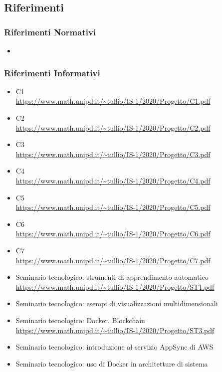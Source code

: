 \subsection{Riferimenti}
\subsubsection{Riferimenti Normativi}
\begin{itemize}
	\item {} %
\end{itemize}

\subsubsection{Riferimenti Informativi}
\begin{itemize}
	\item{C1\\
		\url{https://www.math.unipd.it/~tullio/IS-1/2020/Progetto/C1.pdf}}
	\item{C2\\
		\url{https://www.math.unipd.it/~tullio/IS-1/2020/Progetto/C2.pdf}}
	\item{C3\\
		\url{https://www.math.unipd.it/~tullio/IS-1/2020/Progetto/C3.pdf}}
	\item{C4\\
		\url{https://www.math.unipd.it/~tullio/IS-1/2020/Progetto/C4.pdf}}
	\item{C5\\
		\url{https://www.math.unipd.it/~tullio/IS-1/2020/Progetto/C5.pdf}}
	\item{C6\\
		\url{https://www.math.unipd.it/~tullio/IS-1/2020/Progetto/C6.pdf}}
	\item{C7\\
		\url{https://www.math.unipd.it/~tullio/IS-1/2020/Progetto/C7.pdf}}
	
	\item {Seminario tecnologico: strumenti di apprendimento automatico\\
		\url{https://www.math.unipd.it/~tullio/IS-1/2020/Progetto/ST1.pdf}}
	\item {Seminario tecnologico: esempi di visualizzazioni multidimensionali}
	
	\item {Seminario tecnologico: Docker, Blockchain\\
		\url{https://www.math.unipd.it/~tullio/IS-1/2020/Progetto/ST3.pdf}}
	\item {Seminario tecnologico: introduzione al servizio AppSync di AWS}
	
	\item {Seminario tecnologico: uso di Docker in architetture di sistema}
\end{itemize}


